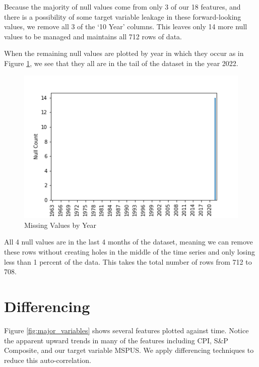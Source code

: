 \documentclass [MS] {uclathes}
\begin{document}
Because the majority of null values come from only 3 of our 18 features, and there is a possibility of some target variable leakage in these forward-looking values, we remove all 3 of the `10 Year' columns. This leaves only 14 more null values to be managed and maintains all 712 rows of data.

When the remaining null values are plotted by year in which they occur as in Figure \ref{fig:null_count_by_year}, we see that they all are in the tail of the dataset in the year 2022.

\begin{figure}[h!]
    \centering
    \includegraphics[scale=0.75]{figures/null_count_by_year.png}
    \caption{Missing Values by Year}
    \label{fig:null_count_by_year}
\end{figure}

All 4 null values are in the last 4 months of the dataset, meaning we can remove these rows without creating holes in the middle of the time series and only losing less than 1 percent of the data. This takes the total number of rows from 712 to 708.




\section{Differencing}

Figure \ref{fig:major_variables} shows several features plotted against time. Notice the apparent upward trends in many of the features including CPI, S\&P Composite, and our target variable MSPUS. We apply differencing techniques to reduce this auto-correlation.\cite{Hyndman_stationarity_2021}
\end{document}
